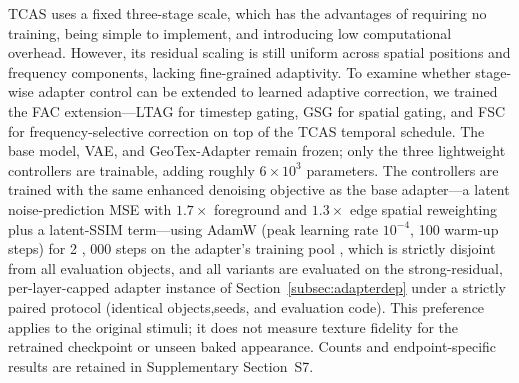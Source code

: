 \documentclass[times,twocolumn,final]{elsarticle}
\providecommand{\DIFadd}[1]{{\protect\color{blue} \sf #1}} %
\providecommand{\DIFdel}[1]{{\protect\color{red} \scriptsize #1}} %
\providecommand{\DIFaddbegin}{} %
\providecommand{\DIFaddend}{} %
\providecommand{\DIFdelend}{} %
\begin{document}

\DIFdel{TCAS uses a fixed three-stage scale, which has the advantages of requiring no training, being simple to implement, and introducing low computational overhead. However, its residual scaling is still uniform across spatial positions and frequency components, lacking fine-grained adaptivity. To examine whether stage-wise adapter control can be extended to learned adaptive correction, we trained the FAC extension---LTAG for timestep gating, GSG for spatial gating, and FSC for frequency-selective correction on top of the TCAS temporal schedule. The base model, VAE, and GeoTex-Adapter remain frozen; only the three lightweight controllers are trainable, adding roughly $6\times10^{3}$ parameters.
The controllers are trained with the same enhanced denoising objective as the base adapter---a latent noise-prediction MSE with $1.7\times$ foreground and $1.3\times$ edge spatial reweighting plus a latent-SSIM term---using AdamW (peak learning rate $10^{-4}$, 100 warm-up steps) for 2}%
\DIFdel{,}%
\DIFdel{000 steps on the adapter's training pool , which is strictly disjoint from all evaluation objects, and all variants are evaluated on the strong-residual, per-layer-capped adapter instance of Section~\ref{subsec:adapterdep} under a strictly paired protocol (identical objects,seeds, and evaluation code).
}\DIFdelend \DIFaddbegin \DIFadd{This preference applies to the original stimuli; it does not measure texture fidelity for the retrained checkpoint or unseen baked appearance. Counts and endpoint-specific results are retained in Supplementary Section~S7.
}\DIFaddend 
\end{document}
